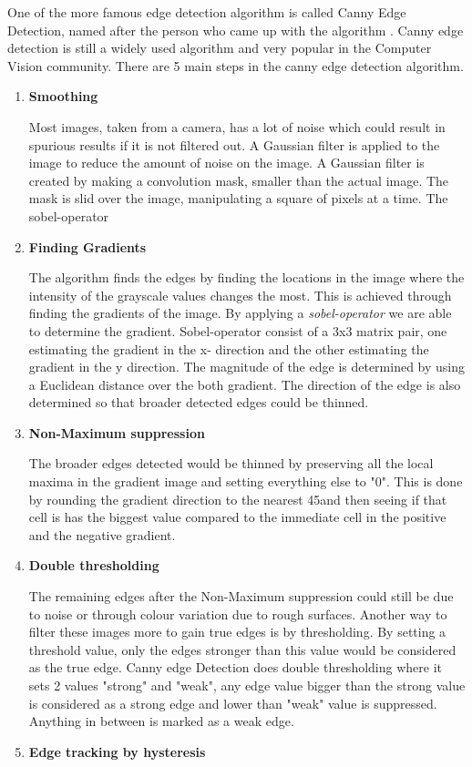 One of the more famous edge detection algorithm is called Canny Edge Detection\cite{canny-paper}, named after the person who came up with the algorithm \citeauthor{canny-paper}. Canny edge detection is still a widely used algorithm and very popular in the Computer Vision community. There are 5 main steps in the canny edge detection algorithm\cite{canny-tutorial}.
\begin{enumerate}
\item \textbf{Smoothing}

Most images, taken from a camera, has a lot of noise which could result in spurious results if it is not filtered out. A Gaussian filter is applied to the image to reduce the amount of noise on the image. A Gaussian filter is created by making a convolution mask, smaller than the actual image. The mask is slid over the image, manipulating a square of pixels at a time\cite{canny-tutorial2}. The sobel-operator
\item \textbf{Finding Gradients}

The algorithm finds the edges by finding the locations in the image where the intensity of the grayscale values changes the most. This is achieved through finding the gradients of the image. By applying a \emph{sobel-operator} we are able to determine the gradient\cite{sobel-operator}. Sobel-operator consist of a 3x3 matrix pair, one estimating the gradient in the x- direction and the other estimating the gradient in the y direction. The magnitude of the edge is determined by using a Euclidean distance over the both gradient. The direction of the edge is also determined so that broader detected edges could be thinned.
\item \textbf{Non-Maximum suppression}

The broader edges detected would be thinned by preserving all the local maxima in the gradient image and setting everything else to "0". This is done by rounding the gradient direction to the nearest 45\textdegree and then seeing if that cell is has the biggest value compared to the immediate cell in the positive and the negative gradient. 
\item \textbf{Double thresholding}

The remaining edges after the Non-Maximum suppression could still be due to noise or through colour variation due to rough surfaces. Another way to filter these images more to gain true edges is by thresholding. By setting a threshold value, only the edges stronger than this value would be considered as the true edge. Canny edge Detection does double thresholding where it sets 2 values "strong" and "weak", any edge value bigger than the strong value is considered as a strong edge and lower than "weak"  value is suppressed. Anything in between is marked as a weak edge.
\item \textbf{Edge tracking by hysteresis}


\end{enumerate}
